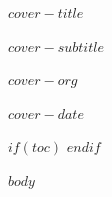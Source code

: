 \documentclass[12pt, a4paper]{article}
\begin{document}
\begin{titlepage}
  \vspace*{4cm}
  \begin{center}
    {\LARGE\bfseries $cover-title$\par}
    \vspace{1cm}
    {\large $cover-subtitle$\par}
    \vspace{2cm}
    {\normalsize $cover-org$\par}
    \vfill
    {\small $cover-date$}
  \end{center}
\end{titlepage}

$if(toc)$
\tableofcontents
\thispagestyle{fancy}
\newpage
$endif$

$body$
\end{document}

